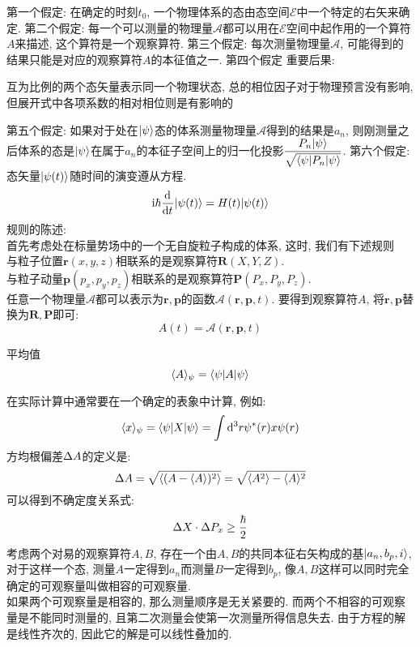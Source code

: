 \documentclass[UTF8]{ctexart}
\numberwithin{equation}{subsection}
\newcommand{\ntswd}[1]{
    \begin{center}
        \begin{noticeswd}{}{}
            #1
        \end{noticeswd}
    \end{center}
}
\begin{document}
第一个假定: 在确定的时刻$t_0$, 一个物理体系的态由态空间$\mathscr{E}$中一个特定的右矢来确定. 
第二个假定: 每一个可以测量的物理量$\mathscr{A}$都可以用在$\mathscr{E}$空间中起作用的一个算符$A$来描述, 这个算符是一个观察算符. 
第三个假定: 每次测量物理量$\mathscr{A}$, 可能得到的结果只能是对应的观察算符$A$的本征值之一. 
第四个假定
重要后果:
\ntswd{互为比例的两个态矢量表示同一个物理状态, 总的相位因子对于物理预言没有影响, 但展开式中各项系数的相对相位则是有影响的}
第五个假定: 如果对于处在$| {\psi} \rangle$态的体系测量物理量$\mathscr{A}$得到的结果是$a_n$, 则刚测量之后体系的态是$| {\psi} \rangle$在属于$a_n$的本征子空间上的归一化投影$\displaystyle \frac{P_n| {\psi} \rangle}{\sqrt{\langle {\psi|P_n|\psi} \rangle}}$.
第六个假定: 态矢量$| {\psi(t)} \rangle$随时间的演变遵从\sch 方程.
$$\mathrm{i}\hbar\frac{\mathrm{d}^{} }{\mathrm{d} t^{}}| {\psi(t)} \rangle=H(t)| {\psi(t)} \rangle$$
规则的陈述: \\
首先考虑处在标量势场中的一个无自旋粒子构成的体系, 这时, 我们有下述规则\\
与粒子位置$\bm{r}(x,y,z)$相联系的是观察算符$\bm{R}(X,Y,Z)$. \\
与粒子动量$\bm{p}(p_x,p_y,p_z)$相联系的是观察算符$\bm{P}(P_x,P_y,P_z)$.\\
任意一个物理量$\mathscr{A}$都可以表示为$\bm{r},\bm{p}$的函数$\mathscr{A}(\bm{r},\bm{p},t)$. 要得到观察算符$A$, 将$\bm{r},\bm{p}$替换为$\bm{R},\bm{P}$即可: 
$$A(t)=\mathscr{A}(\bm{r},\bm{p},t)$$
\begin{defi}{平均值}{}
$$\langle {A} \rangle_\psi=\langle {\psi|A|\psi} \rangle$$
\end{defi}
在实际计算中通常要在一个确定的表象中计算, 例如:
$$\langle {x} \rangle_\psi=\langle {\psi|X|\psi} \rangle=\int\mathop{}\!\mathrm{d}^3r \psi^*(r)x\psi(r)$$
方均根偏差$\Delta A$的定义是: 
$$\Delta A=\sqrt{\langle {(A-\langle {A} \rangle)^2} \rangle}=\sqrt{\langle {A^2} \rangle-\langle {A} \rangle^2}$$
可以得到不确定度关系式:
$$\Delta X\cdot \Delta P_x \geq \frac{\hbar}{2}$$
考虑两个对易的观察算符$A,B$, 存在一个由$A,B$的共同本征右矢构成的基$| {a_n,b_p,i} \rangle$, 对于这样一个态, 测量$A$一定得到$a_n$而测量$B$一定得到$b_p$, 像$A,B$这样可以同时完全确定的可观察量叫做相容的可观察量. \\
如果两个可观察量是相容的, 那么测量顺序是无关紧要的. 而两个不相容的可观察量是不能同时测量的, 且第二次测量会使第一次测量所得信息失去. 
由于\sch 方程的解是线性齐次的, 因此它的解是可以线性叠加的. 
\end{document}
